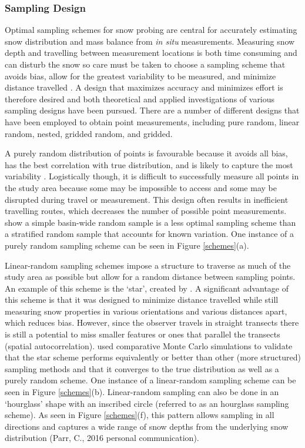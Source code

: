 \documentclass[12pt]{article}
\begin{document}
\subsubsection{Sampling Design}

Optimal sampling schemes for snow probing are central for accurately estimating snow distribution and mass balance from \textit{in situ} measurements. Measuring snow depth and travelling between measurement locations is both time consuming and can disturb the snow so care must be taken to choose a sampling scheme that avoids bias, allow for the greatest variability to be measured, and minimize distance travelled \citep{Shea2010}. A design that maximizes accuracy and minimizes effort is therefore desired \citep{Elder1991} and both theoretical \citep{Trujillo2015} and applied \citep{Kronholm2004,Shea2010} investigations of various sampling designs have been pursued. There are a number of different designs that have been employed to obtain point measurements, including pure random, linear random, nested, gridded random, and gridded. 

A purely random distribution of points is favourable because it avoids all bias, has the best correlation with true distribution, and is likely to capture the most variability \citep{Kronholm2007, Shea2010}. Logistically though, it is difficult to successfully measure all points in the study area because some may be impossible to access and some may be disrupted during travel or measurement. This design often results in inefficient travelling routes, which decreases the number of possible point measurements. \cite{Elder1991} show a simple basin-wide random sample is a less optimal sampling scheme than a stratified random sample that accounts for known variation. One instance of a purely random sampling scheme can be seen in Figure \ref{schemes}(a). 

Linear-random sampling schemes impose a structure to traverse as much of the study area as possible but allow for a random distance between sampling points. An example of this scheme is the `star', created by \cite{Shea2010}. A significant advantage of this scheme is that it was designed to minimize distance travelled while still measuring snow properties in various orientations and various distances apart, which reduces bias. However, since the observer travels in straight transects there is still a potential to miss smaller features or ones that parallel the transects (spatial autocorrelation). \cite{Shea2010} used comparative Monte Carlo simulations to validate that the star scheme performs equivalently or better than other (more structured) sampling methods and that it converges to the true distribution as well as a purely random scheme. One instance of a linear-random sampling scheme can be seen in Figure \ref{schemes}(b). Linear-random sampling can also be done in an `hourglass' shape with an inscribed circle (referred to as an hourglass sampling scheme). As seen in Figure \ref{schemes}(f), this pattern allows sampling in all directions and captures a wide range of snow depths from the underlying snow distribution (Parr, C., 2016 personal communication).
\end{document}
